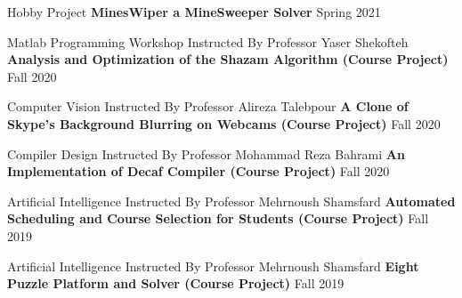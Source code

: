 \begin{cventries}
    \cventry
    {Hobby Project}
    {\textbf {MinesWiper a MineSweeper Solver}}
    {}
    {Spring 2021}
    {}
    \vspace{0.35 cm}
    
    \cventry
    {Matlab Programming Workshop Instructed By Professor Yaser Shekofteh}
    {\textbf {Analysis and Optimization of the Shazam Algorithm (Course Project)}}
    {}
    {Fall 2020}
    {}
    \vspace{0.35 cm}
    
    \cventry
    {Computer Vision Instructed By Professor Alireza Talebpour}
    {\textbf {A Clone of Skype's Background Blurring on Webcams (Course Project)}}
    {}
    {Fall 2020}
    {}
    \vspace{0.35 cm}

    \cventry
    {Compiler Design Instructed By Professor Mohammad Reza Bahrami}
    {\textbf {An Implementation of Decaf Compiler (Course Project)}}
    {}
    {Fall 2020}
    {}
    \vspace{0.35 cm}

    \cventry
    {Artificial Intelligence Instructed By Professor Mehrnoush Shamsfard}
    {\textbf {Automated Scheduling and Course Selection for Students (Course Project)}}
    {}
    {Fall 2019}
    {}
    \vspace{0.35 cm}

    \cventry
    {Artificial Intelligence Instructed By Professor Mehrnoush Shamsfard}
    {\textbf {Eight Puzzle Platform and Solver (Course Project)}}
    {}
    {Fall 2019}
    {}
    
\end{cventries}